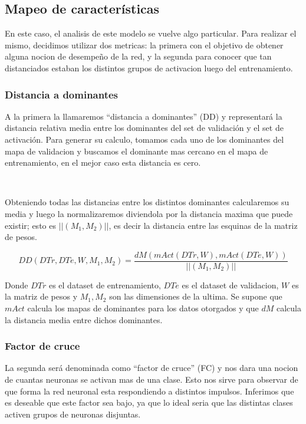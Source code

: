 \documentclass[informe.tex]{subfiles}
\begin{document}
      
      
    \subsection{Mapeo de características}
    
      En este caso, el analisis de este modelo se vuelve algo particular. Para realizar el mismo, decidimos utilizar dos metricas: la primera con el objetivo de obtener alguna nocion de desempe\~no de la red, y la segunda para conocer que tan distanciados estaban los distintos grupos de activacion luego del entrenamiento.
      
      
      \subsubsection{Distancia a dominantes}
      
      A la primera la llamaremos ``distancia a dominantes'' (DD) y representar\'a la distancia relativa media entre los dominantes del set de validaci\'on y el set de activaci\'on. Para generar su calculo, tomamos cada uno de los dominantes del mapa de validacion y buscamos el dominante mas cercano en el mapa de entrenamiento, en el mejor caso esta distancia es cero. 
      
      ~
      
      Obteniendo todas las distancias entre los distintos dominantes calcularemos su media y luego la normalizaremos diviendola por la distancia maxima que puede existir; esto es $||(M_1,M_2)||$, es decir la distancia entre las esquinas de la matriz de pesos.
      
      $$DD(DTr, DTe, W, M_1, M_2) = \frac{dM(mAct(DTr,W), mAct(DTe,W))}{||(M_1,M_2)||}$$
      
      Donde $DTr$ es el dataset de entrenamiento, $DTe$ es el dataset de validacion, $W$ es la matriz de pesos y $M_1, M_2$  son las dimensiones de la ultima. Se supone que $mAct$ calcula los mapas de dominantes para los datos otorgados y que $dM$ calcula la distancia media entre dichos dominantes.
      
      \subsubsection{Factor de cruce}
      
      La segunda ser\'a denominada como ``factor de cruce'' (FC) y nos dara una nocion de cuantas neuronas se activan mas de una clase. Esto nos sirve para observar de que forma la red neuronal esta respondiendo a distintos impulsos. Inferimos que es deseable que este factor sea bajo, ya que lo ideal seria que las distintas clases activen grupos de neuronas disjuntas.
      
\end{document}
